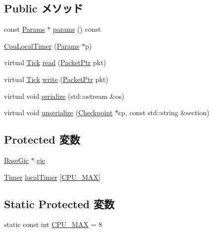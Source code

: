 \subsection*{Public メソッド}
\begin{DoxyCompactItemize}
\item 
const \hyperlink{classCpuLocalTimer_a2abacbbb646e91ed1ef591d6ce81f4e3}{Params} $\ast$ \hyperlink{classCpuLocalTimer_acd3c3feb78ae7a8f88fe0f110a718dff}{params} () const 
\item 
\hyperlink{classCpuLocalTimer_ae7c3cd295b79e672e3294e726eb27f61}{CpuLocalTimer} (\hyperlink{classCpuLocalTimer_a2abacbbb646e91ed1ef591d6ce81f4e3}{Params} $\ast$p)
\item 
virtual \hyperlink{base_2types_8hh_a5c8ed81b7d238c9083e1037ba6d61643}{Tick} \hyperlink{classCpuLocalTimer_a613ec7d5e1ec64f8d21fec78ae8e568e}{read} (\hyperlink{classPacket}{PacketPtr} pkt)
\item 
virtual \hyperlink{base_2types_8hh_a5c8ed81b7d238c9083e1037ba6d61643}{Tick} \hyperlink{classCpuLocalTimer_a4cefab464e72b5dd42c003a0a4341802}{write} (\hyperlink{classPacket}{PacketPtr} pkt)
\item 
virtual void \hyperlink{classCpuLocalTimer_a53e036786d17361be4c7320d39c99b84}{serialize} (std::ostream \&os)
\item 
virtual void \hyperlink{classCpuLocalTimer_af22e5d6d660b97db37003ac61ac4ee49}{unserialize} (\hyperlink{classCheckpoint}{Checkpoint} $\ast$cp, const std::string \&section)
\end{DoxyCompactItemize}
\subsection*{Protected 変数}
\begin{DoxyCompactItemize}
\item 
\hyperlink{classBaseGic}{BaseGic} $\ast$ \hyperlink{classCpuLocalTimer_a2e2266dca56928f63667e994933169ee}{gic}
\item 
\hyperlink{classCpuLocalTimer_1_1Timer}{Timer} \hyperlink{classCpuLocalTimer_ad9495d6ed4425c81f8f33c7df84a0ada}{localTimer} \mbox{[}\hyperlink{classCpuLocalTimer_a4b102c882c8ecd5172c3f918fcde9c6d}{CPU\_\-MAX}\mbox{]}
\end{DoxyCompactItemize}
\subsection*{Static Protected 変数}
\begin{DoxyCompactItemize}
\item 
static const int \hyperlink{classCpuLocalTimer_a4b102c882c8ecd5172c3f918fcde9c6d}{CPU\_\-MAX} = 8
\end{DoxyCompactItemize}


